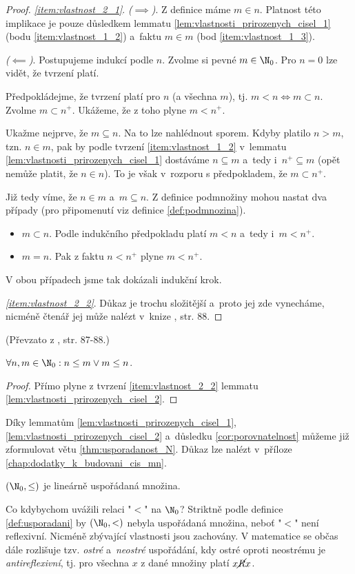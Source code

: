 \begin{proof}
    \textit{\ref{item:vlastnost_2_1}}. \textit{($\implies$)}. Z definice máme $m\in n$. Platnost této implikace je pouze důsledkem lemmatu \ref{lem:vlastnosti_prirozenych_cisel_1} (bodu \ref{item:vlastnost_1_2}) a~faktu $m\in m$ (bod \ref{item:vlastnost_1_3}).\par
    \textit{($\impliedby$)}. Postupujeme indukcí podle $n$. Zvolme si pevné $m\in\N_0$. Pro $n=0$ lze vidět, že tvrzení platí.\par
    Předpokládejme, že tvrzení platí pro $n$ (a všechna $m$), tj. $m<n\iff m\subset n$. Zvolme $m\subset n^+$. Ukážeme, že z toho plyne $m<n^+$.\par
    Ukažme nejprve, že $m\subseteq n$. Na to lze nahlédnout sporem. Kdyby platilo $n>m$, tzn. $n\in m$, pak by podle tvrzení \ref{item:vlastnost_1_2} v~lemmatu \ref{lem:vlastnosti_prirozenych_cisel_1} dostáváme $n\subseteq m$ a~tedy i~$n^+\subseteq m$ (opět nemůže platit, že $n\in n$). To je však v~rozporu s předpokladem, že $m\subset n^+$.\par
    Již tedy víme, že $n\in m$ a~$m\subseteq n$. Z definice podmnožiny mohou nastat dva případy (pro připomenutí viz definice \ref{def:podmnozina}).
    \begin{itemize}
        \item $m\subset n$. Podle indukčního předpokladu platí $m<n$ a~tedy i~$m<n^+$.
        \item $m=n$. Pak z faktu $n<n^+$ plyne $m<n^+$.
    \end{itemize}
    V obou případech jsme tak dokázali indukční krok.\par
    \textit{\ref{item:vlastnost_2_2}}. Důkaz je trochu složitější a~proto jej zde vynecháme, nicméně čtenář jej může nalézt v~knize \cite{BalcarStepanek1986}, str. 88.
\end{proof}
(Převzato z \cite{BalcarStepanek1986}, str. 87-88.)\par
\begin{corollary}\label{cor:porovnatelnost}
    $\forall n,m\in\N_0: n\leq m \lor m\leq n$.
\end{corollary}
\begin{proof}
    Přímo plyne z tvrzení \ref{item:vlastnost_2_2} lemmatu \ref{lem:vlastnosti_prirozenych_cisel_2}.
\end{proof}
Díky lemmatům \ref{lem:vlastnosti_prirozenych_cisel_1}, \ref{lem:vlastnosti_prirozenych_cisel_2} a~důsledku \ref{cor:porovnatelnost} můžeme již zformulovat větu \ref{thm:usporadanost_N}. Důkaz lze nalézt v~příloze \ref{chap:dodatky_k_budovani_cis_mn}.
\begin{theorem}\label{thm:usporadanost_N}
    $(\N_0,\leq)$ je lineárně uspořádaná množina.
\end{theorem}
Co kdybychom uvážili relaci "$<$" na $\N_0$? Striktně podle definice \ref{def:usporadani} by $(\N_0,<)$ nebyla uspořádaná množina, neboť "$<$" není reflexivní. Nicméně zbývající vlastnosti jsou zachovány. V matematice se občas dále rozlišuje tzv. \emph{ostré} a~\emph{neostré} uspořádání, kdy ostré oproti neostrému je \emph{antireflexivní}, tj. pro všechna $x$ z dané množiny platí $x\cancel{R}x$.